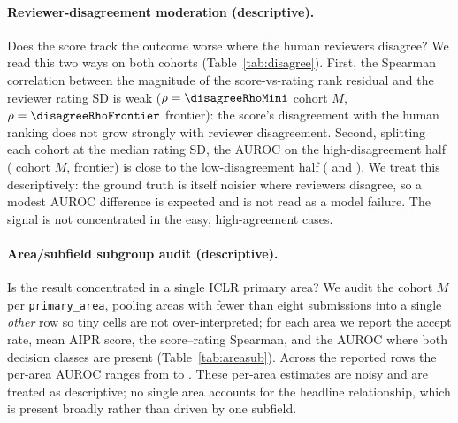 \begin{table}[h]
  \centering
  \caption{Bottom-band tie/threshold sensitivity of the low-score flag
  (AIPR (GPT-5.4-mini), descriptive). Per band definition: reject rate, lift over the base
  reject rate, and oral rate. The flag holds across the quintile, deterministic
  bottom-$K$, and fixed-cutoff rules.}
  \label{tab:bandsens}
  
\end{table}

\paragraph{Reviewer-disagreement moderation (descriptive).} Does the score track
the outcome worse where the human reviewers disagree? We read this two ways on
both cohorts (Table~\ref{tab:disagree}). First, the Spearman correlation between
the magnitude of the score-vs-rating rank residual and the reviewer rating SD is
weak ($\rho=\disagreeRhoMini$ cohort $M$, $\rho=\disagreeRhoFrontier$ frontier):
the score's disagreement with the human ranking does not grow strongly with
reviewer disagreement. Second, splitting each cohort at the median rating SD, the
AUROC on the high-disagreement half (\disagreeAucHighMini{} cohort $M$,
\disagreeAucHighFrontier{} frontier) is close to the low-disagreement half
(\disagreeAucLowMini{} and \disagreeAucLowFrontier{}). We treat this
descriptively: the ground truth is itself noisier where reviewers disagree, so a
modest AUROC difference is expected and is not read as a model failure. The signal
is not concentrated in the easy, high-agreement cases.

\begin{table}[h]
  \centering
  \caption{Reviewer-disagreement moderation (descriptive, both cohorts). The
  residual--rating-SD Spearman and the AUROC of the AIPR overall split at the
  median reviewer rating SD. Disagreement does not strongly moderate the
  score--outcome relationship.}
  \label{tab:disagree}
  
\end{table}

\paragraph{Area/subfield subgroup audit (descriptive).} Is the result
concentrated in a single ICLR primary area? We audit the cohort $M$ per
\texttt{primary\_area}, pooling areas with fewer than eight submissions into a
single \emph{other} row so tiny cells are not over-interpreted; for each area we
report the accept rate, mean AIPR score, the score--rating Spearman, and the
AUROC where both decision classes are present (Table~\ref{tab:areasub}). Across
the \nAreaRows{} reported rows the per-area AUROC ranges from \areaAurocMin{} to
\areaAurocMax{}. These per-area estimates are noisy and are treated as
descriptive; no single area accounts for the headline relationship, which is
present broadly rather than driven by one subfield.

